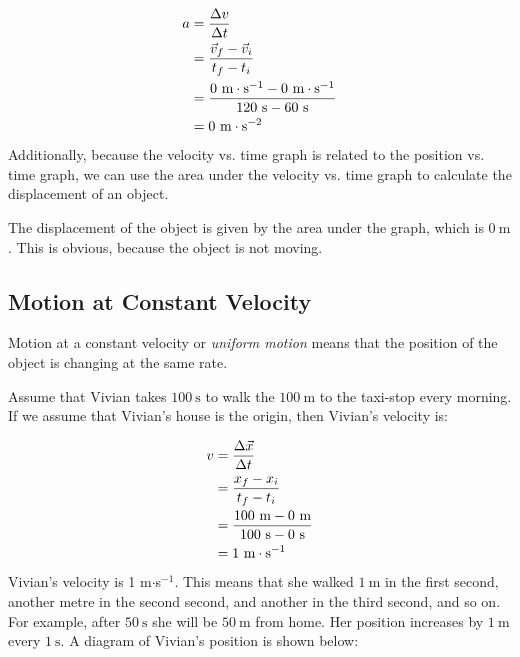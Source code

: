     \begin{align*}
    a &= \frac{\Delta v}{\Delta t}\hfill \\ 
    &= \frac{\vec{v}_{f}-\vec{v}_{i}}{{t}_{f}-{t}_{i}}\hfill \\ 
    &= \frac{0~\text{m}\cdot\text{s}^{-1}-0~\text{m}\cdot\text{s}^{-1}}{120~\text{s}-60~\text{s}}\\ 
    &= 0~\text{m}\cdot\text{s}^{-2}
      \end{align*}
        \label{m38795*id69809}Additionally, because the velocity vs. time graph is related to the position vs. time graph, we can use the area under the velocity vs. time graph to calculate the displacement of an object.\par 
\label{m38795*notfhsst!!!underscore!!!id2134}
	\par
        \label{m38795*id69821}The displacement of the object is given by the area under the graph, which is $0~\text{m}$. This is obvious, because the object is not moving.\par 
      \label{m38795*uid90}
            \subsection*{Motion at Constant Velocity}
            \nopagebreak
        \label{m38795*id69835}Motion at a constant velocity or \textsl{uniform motion} means that the position of the object is changing at the same rate.\par 
        \label{m38795*id69845}Assume that Vivian takes $100~\text{s}$ to walk the $100~\text{m}$ to the taxi-stop every morning. If we assume that Vivian's house is the origin, then Vivian's velocity is:\par 
        \label{m38795*id69850}\nopagebreak\noindent{}
          
    \begin{align*}
    	v&= \frac{\Delta \vec{x}}{\Delta t}\hfill \\ 
	&= \frac{{x}_{f}-{x}_{i}}{{t}_{f}-{t}_{i}}\hfill \\ 
	&= \frac{100~\text{m}-0~\text{m}}{100~\text{s}-0~\text{s}}\\ 
	 &= 1~\text{m}\cdot{\text{s}}^{-1}
      \end{align*}
        \label{m38795*id70029}Vivian's velocity is 1 m$\ensuremath{\cdot}$s${}^{-1}$. This means that she walked $1~\text{m}$ in the first second, another metre in the second second, and another in the third second, and so on. For example, after $50~\text{s}$ she will be $50~\text{m}$ from home. Her position increases by $1~\text{m}$ every $1~\text{s}$. A diagram of Vivian's position is shown below:\par 

